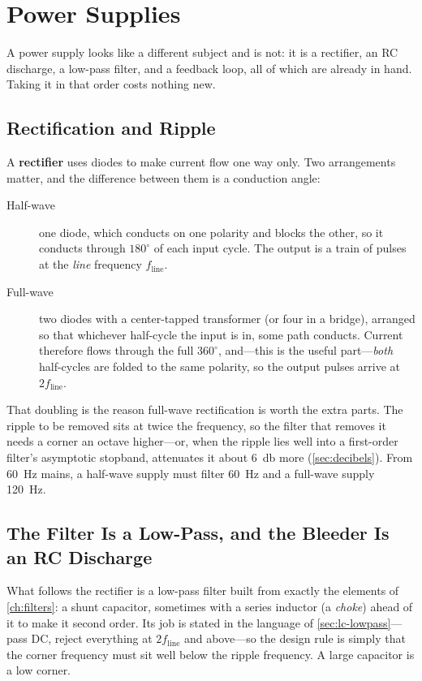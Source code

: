 \section{Power Supplies}
A power supply looks like a different subject and is not: it is a rectifier, an RC
discharge, a low-pass filter, and a feedback loop, all of which are already in hand.
Taking it in that order costs nothing new.

\subsection{Rectification and Ripple}
A \textbf{rectifier} uses diodes to make current flow one way only. Two
arrangements matter, and the difference between them is a conduction angle:
\begin{description}
\item[Half-wave] one diode, which conducts on one polarity and blocks the other, so
it conducts through \(180^\circ\) of each input cycle. The output is a train of
pulses at the \emph{line} frequency \(f_{\text{line}}\).
\item[Full-wave] two diodes with a center-tapped transformer (or four in a bridge),
arranged so that whichever half-cycle the input is in, some path conducts. Current
therefore flows through the full \(360^\circ\), and---this is the useful
part---\emph{both} half-cycles are folded to the same polarity, so the output pulses
arrive at \(2f_{\text{line}}\).
\end{description}
That doubling is the reason full-wave rectification is worth the extra parts. The
ripple to be removed sits at twice the frequency, so the filter that removes it
needs a corner an octave higher---or, when the ripple lies well into a first-order
filter's asymptotic stopband, attenuates it about \SI{6}{\decibel} more
(\cref{sec:decibels}). From \SI{60}{\hertz} mains, a
half-wave supply must filter \SI{60}{\hertz} and a full-wave supply
\SI{120}{\hertz}.

\subsection{The Filter Is a Low-Pass, and the Bleeder Is an RC Discharge}
What follows the rectifier is a low-pass filter built from exactly the elements of
\cref{ch:filters}: a shunt capacitor, sometimes with a series inductor (a
\emph{choke}) ahead of it to make it second order. Its job is stated in the language
of \cref{sec:lc-lowpass}---pass DC, reject everything at \(2f_{\text{line}}\) and
above---so the design rule is simply that the corner frequency must sit well below
the ripple frequency. A large capacitor is a low corner.


